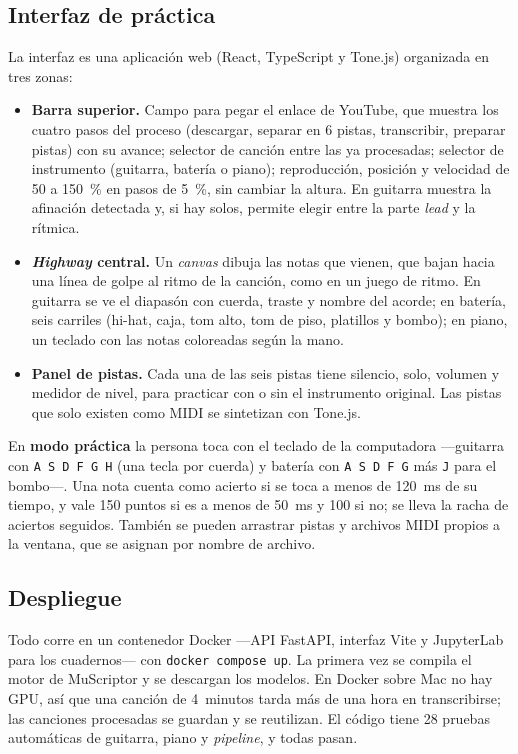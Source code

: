 \documentclass[11pt,a4paper]{article}
\begin{document}
\subsection{Interfaz de práctica}
La interfaz es una aplicación web (React, TypeScript y Tone.js) organizada en tres zonas:
\begin{itemize}[leftmargin=1.5em]
\item \textbf{Barra superior.} Campo para pegar el enlace de YouTube, que muestra los cuatro pasos del
proceso (descargar, separar en 6 pistas, transcribir, preparar pistas) con su avance; selector de
canción entre las ya procesadas; selector de instrumento (guitarra, batería o piano); reproducción,
posición y velocidad de 50 a 150~\% en pasos de 5~\%, sin cambiar la altura. En guitarra muestra la
afinación detectada y, si hay solos, permite elegir entre la parte \emph{lead} y la rítmica.
\item \textbf{\emph{Highway} central.} Un \emph{canvas} dibuja las notas que vienen, que bajan hacia una línea
de golpe al ritmo de la canción, como en un juego de ritmo. En guitarra se ve el diapasón con cuerda,
traste y nombre del acorde; en batería, seis carriles (hi-hat, caja, tom alto, tom de piso, platillos y
bombo); en piano, un teclado con las notas coloreadas según la mano.
\item \textbf{Panel de pistas.} Cada una de las seis pistas tiene silencio, solo, volumen y medidor de
nivel, para practicar con o sin el instrumento original. Las pistas que solo existen como MIDI se
sintetizan con Tone.js.
\end{itemize}
En \textbf{modo práctica} la persona toca con el teclado de la computadora ---guitarra con
\texttt{A S D F G H} (una tecla por cuerda) y batería con \texttt{A S D F G} más \texttt{J} para el
bombo---. Una nota cuenta como acierto si se toca a menos de 120~ms de su tiempo, y vale 150 puntos si
es a menos de 50~ms y 100 si no; se lleva la racha de aciertos seguidos. También se pueden arrastrar
pistas y archivos MIDI propios a la ventana, que se asignan por nombre de archivo.

\subsection{Despliegue}
Todo corre en un contenedor Docker ---API FastAPI, interfaz Vite y JupyterLab para los cuadernos--- con
\texttt{docker compose up}. La primera vez se compila el motor de MuScriptor y se descargan los modelos.
En Docker sobre Mac no hay GPU, así que una canción de 4~minutos tarda más de una hora en transcribirse;
las canciones procesadas se guardan y se reutilizan. El código tiene 28 pruebas automáticas de guitarra,
piano y \emph{pipeline}, y todas pasan.
\end{document}
